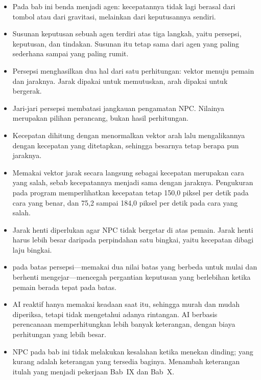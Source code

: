 
\begin{rangkumanbox}
\begin{itemize}
  \item Pada bab ini benda menjadi agen: kecepatannya tidak lagi berasal dari
        tombol atau dari gravitasi, melainkan dari keputusannya sendiri.
  \item Susunan keputusan sebuah agen terdiri atas tiga langkah, yaitu
        persepsi, keputusan, dan tindakan. Susunan itu tetap sama dari agen
        yang paling sederhana sampai yang paling rumit.
  \item Persepsi menghasilkan dua hal dari satu perhitungan: vektor menuju
        pemain dan jaraknya. Jarak dipakai untuk memutuskan, arah dipakai untuk
        bergerak.
  \item Jari-jari persepsi membatasi jangkauan pengamatan NPC. Nilainya
        merupakan pilihan perancang, bukan hasil perhitungan.
  \item Kecepatan dihitung dengan menormalkan vektor arah lalu mengalikannya
        dengan kecepatan yang ditetapkan, sehingga besarnya tetap berapa pun
        jaraknya.
  \item Memakai vektor jarak secara langsung sebagai kecepatan merupakan cara
        yang salah, sebab kecepatannya menjadi sama dengan jaraknya. Pengukuran
        pada program memperlihatkan kecepatan tetap 150,0 piksel per detik pada
        cara yang benar, dan 75,2 sampai 184,0 piksel per detik pada cara yang
        salah.
  \item Jarak henti diperlukan agar NPC tidak bergetar di atas pemain. Jarak
        henti harus lebih besar daripada perpindahan satu bingkai, yaitu
        kecepatan dibagi laju bingkai.
  \item {} pada batas persepsi---memakai dua nilai batas yang
        berbeda untuk mulai dan berhenti mengejar---mencegah pergantian
        keputusan yang berlebihan ketika pemain berada tepat pada batas.
  \item AI reaktif hanya memakai keadaan saat itu, sehingga murah dan mudah
        diperiksa, tetapi tidak mengetahui adanya rintangan. AI berbasis
        perencanaan memperhitungkan lebih banyak keterangan, dengan biaya
        perhitungan yang lebih besar.
  \item NPC pada bab ini tidak melakukan kesalahan ketika menekan dinding; yang
        kurang adalah keterangan yang tersedia baginya. Menambah keterangan
        itulah yang menjadi pekerjaan Bab~IX dan Bab~X.
\end{itemize}
\end{rangkumanbox}
